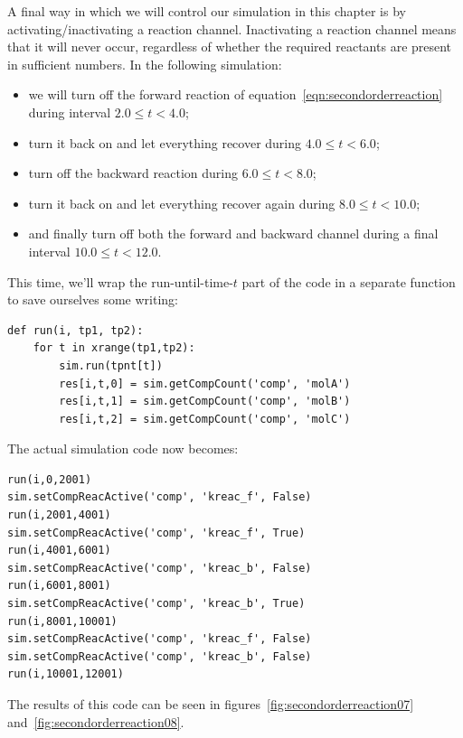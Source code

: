 \documentclass[a4paper,12pt]{book}
\begin{document}
A final way in which we will control our simulation in this chapter is by activating/inactivating a reaction channel. Inactivating a reaction channel means that it will never occur, regardless of whether the required reactants are present in sufficient numbers. In the following simulation: 
\begin{itemize}
\item we will turn off the forward reaction of equation~\ref{eqn:secondorderreaction} during interval $2.0 \leq t < 4.0$;
\item turn it back on and let everything recover during $4.0 \leq t < 6.0$;
\item turn off the backward reaction during $6.0 \leq t < 8.0$; 
\item turn it back on and let everything recover again during $8.0 \leq t < 10.0$;
\item and finally turn off both the forward and backward channel during a final interval $10.0 \leq t < 12.0$.
\end{itemize}
This time, we'll wrap the run-until-time-$t$ part of the code in a separate function to save ourselves some writing:
\begin{verbatim}
def run(i, tp1, tp2):
    for t in xrange(tp1,tp2):
        sim.run(tpnt[t])
        res[i,t,0] = sim.getCompCount('comp', 'molA')
        res[i,t,1] = sim.getCompCount('comp', 'molB')
        res[i,t,2] = sim.getCompCount('comp', 'molC')
\end{verbatim} 

The actual simulation code now becomes:
\begin{verbatim}
run(i,0,2001)
sim.setCompReacActive('comp', 'kreac_f', False)
run(i,2001,4001)
sim.setCompReacActive('comp', 'kreac_f', True)
run(i,4001,6001)
sim.setCompReacActive('comp', 'kreac_b', False)
run(i,6001,8001)
sim.setCompReacActive('comp', 'kreac_b', True)
run(i,8001,10001)
sim.setCompReacActive('comp', 'kreac_f', False)
sim.setCompReacActive('comp', 'kreac_b', False)
run(i,10001,12001)
\end{verbatim}
The results of this code can be seen in figures~\ref{fig:secondorderreaction07} and~\ref{fig:secondorderreaction08}.
\end{document}
